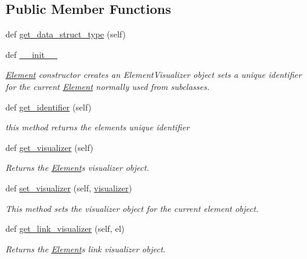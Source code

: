 \subsection*{Public Member Functions}
\begin{DoxyCompactItemize}
\item 
def \hyperlink{classbridges_1_1element_1_1_element_a2ad9d9e6dceb91eb77605a2a4bfff269}{get\+\_\+data\+\_\+struct\+\_\+type} (self)
\item 
def \hyperlink{classbridges_1_1element_1_1_element_a7e4faaaf62093503ff7a10d810e31098}{\+\_\+\+\_\+init\+\_\+\+\_\+}
\begin{DoxyCompactList}\small\item\em \hyperlink{classbridges_1_1element_1_1_element}{Element} constructor creates an Element\+Visualizer object sets a unique identifier for the current \hyperlink{classbridges_1_1element_1_1_element}{Element} normally used from subclasses. \end{DoxyCompactList}\item 
def \hyperlink{classbridges_1_1element_1_1_element_acdb6d4aac75332d8bd3e9dbec47f1e7d}{get\+\_\+identifier} (self)
\begin{DoxyCompactList}\small\item\em this method returns the element\textquotesingle{}s unique identifier \end{DoxyCompactList}\item 
def \hyperlink{classbridges_1_1element_1_1_element_aee2ee2c8445790a6c60f2377964896cb}{get\+\_\+visualizer} (self)
\begin{DoxyCompactList}\small\item\em Returns the \hyperlink{classbridges_1_1element_1_1_element}{Element}\textquotesingle{}s visualizer object. \end{DoxyCompactList}\item 
def \hyperlink{classbridges_1_1element_1_1_element_a9aedfbef600fe7b97f84ae0a8ec1f8fa}{set\+\_\+visualizer} (self, \hyperlink{classbridges_1_1element_1_1_element_a86b560e1c213852ad2e99131f0f1e914}{visualizer})
\begin{DoxyCompactList}\small\item\em This method sets the visualizer object for the current element object. \end{DoxyCompactList}\item 
def \hyperlink{classbridges_1_1element_1_1_element_af04537af8ad9f64047de96a524c8c1f9}{get\+\_\+link\+\_\+visualizer} (self, el)
\begin{DoxyCompactList}\small\item\em Returns the \hyperlink{classbridges_1_1element_1_1_element}{Element}\textquotesingle{}s link visualizer object. \end{DoxyCompactList}\item 

\end{DoxyCompactItemize}
